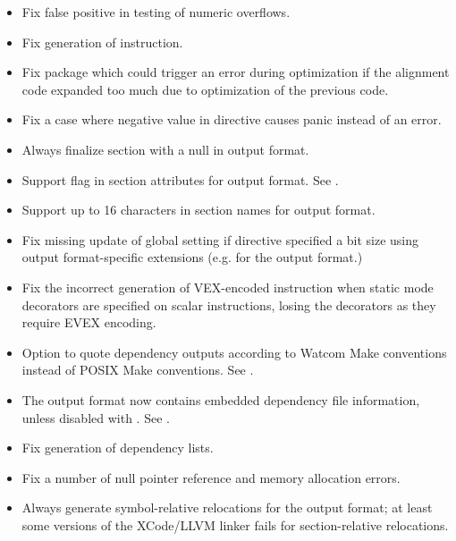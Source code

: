 
\begin{itemize}
    \item{Fix false positive in testing of numeric overflows.}

    \item{Fix generation of  instruction.}

    \item{Fix  package which could trigger an error during
        optimization if the alignment code expanded too much due to
        optimization of the previous code.}

    \item{Fix a case where negative value in  directive causes
        panic instead of an error.}

    \item{Always finalize  section with a null in
         output format.}

    \item{Support  flag in section attributes for 
        output format. See .}

    \item{Support up to 16 characters in section names for 
        output format.}

    \item{Fix missing update of global  setting if 
        directive specified a bit size using output format-specific
        extensions (e.g.  for the  output format.)}

    \item{Fix the incorrect generation of VEX-encoded instruction when static
        mode decorators are specified on scalar instructions, losing the
        decorators as they require EVEX encoding.}

    \item{Option  to quote dependency outputs according to Watcom
        Make conventions instead of POSIX Make conventions. See .}

    \item{The  output format now contains embedded dependency file
        information, unless disabled with . See
        .}

    \item{Fix generation of dependency lists.}

    \item{Fix a number of null pointer reference and memory allocation errors.}

    \item{Always generate symbol-relative relocations for the 
        output format; at least some versions of the XCode/LLVM linker fails
        for section-relative relocations.}
\end{itemize}

